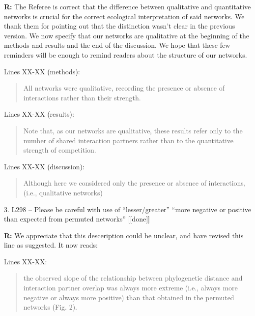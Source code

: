 \documentclass[12pt]{letter}
\begin{document}
		\textbf{R:} The Referee is correct that the difference between qualitative and quantitative networks is crucial for the correct ecological interpretation of said networks. We thank them for pointing out that the distinction wasn't clear in the previous version. We now specify that our networks are qualitative at the beginning of the methods and results and the end of the discussion. We hope that these few reminders will be enough to remind readers about the structure of our networks.

		Lines XX-XX (methods):

		\begin{quotation}

			All networks were qualitative, recording the presence or 
		    absence of interactions rather than their strength.

		\end{quotation}


		Lines XX-XX (results):
		
		\begin{quotation}

			Note that, as our networks 
		    are qualitative, these results refer only to the number of shared interaction
	    	partners rather than to the quantitative strength of competition.

    	\end{quotation}


    	Lines XX-XX (discussion):

    	\begin{quotation}

		  Although here we considered only the presence or absence of interactions,
		  (i.e., qualitative networks)

    	\end{quotation}


	3. L298 – Please be careful with use of “lesser/greater” “more negative or positive than expected from permuted networks” [[done]]

		\textbf{R:} We appreciate that this desceription could be unclear, and have revised this line as suggested. It now reads:

		Lines XX-XX:

		\begin{quotation}

			the observed 
		    slope of the relationship between phylogenetic distance and interaction 
		    partner overlap was always more extreme (i.e., always more negative or 
		    always more positive) than that obtained in the permuted networks (Fig. 2).

	    \end{quotation}
\end{document}
